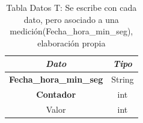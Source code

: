 \begin{table}[H]
	\centering
	\begin{tabular}{| c | c |}
		\hline
		\multicolumn{1}{|c|}{\textit{Dato}}&
		\multicolumn{1}{c|}{\textit{Tipo}}\\ \hline
		\textbf{Fecha\_hora\_min\_seg}  & String  \\ \hline
		\textbf{Contador}  & int  \\ \hline
		Valor & int  \\ \hline
	\end{tabular}
	\caption{Tabla Datos T: Se escribe con cada dato, pero asociado a una medición(Fecha\_hora\_min\_seg), elaboración propia}
	\label{tabla_datos_T}
\end{table}

